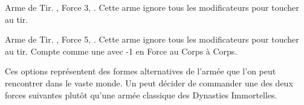\closearmyspecialrules









\vspace*{1.5cm}
\startarmyarmoury

\startitemlistonecol

\listitemonecol{\aspenbow} Arme de Tir. , Force 3, \volleyfire{}. Cette arme ignore tous les modificateurs pour toucher au tir.

\listitemonecol{\greataspenbow} Arme de Tir. , Force 5, \volleyfire{}. Cette arme ignore tous les modificateurs pour toucher au tir. Compte comme une \hw{} avec -1 en Force au Corps à Corps.

\enditemlistonecol

\closearmyarmoury







\startarmynewsection{\monarchsofundead}

\spaceaftersection{}

\begin{center}
\noindent Ces options représentent des formes alternatives de l'armée que l'on peut rencontrer dans le vaste monde. Un \pharaoh{} peut décider de commander une des deux forces suivantes plutôt qu'une armée classique des Dynasties Immortelles.
\end{center}

